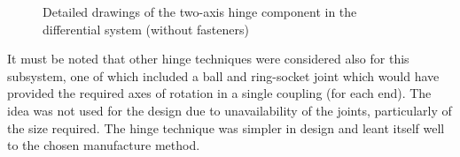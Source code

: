         \begin{figure}[h!]
        \centering
        \caption[Detailed drawings of the two-axis hinge component in the differential system (without fasteners)]{Detailed drawings of the two-axis hinge component in the differential system (without fasteners)}
        \label{fig:mechDesign-twoAxisHingeDetail}
        \end{figure}
        
        It must be noted that other hinge techniques were considered also for this subsystem, one of which included a ball and ring-socket joint which would have provided the required axes of rotation in a single coupling (for each end). The idea was not used for the design due to unavailability of the joints, particularly of the size required. The hinge technique was simpler in design and leant itself well to the chosen manufacture method.
        
